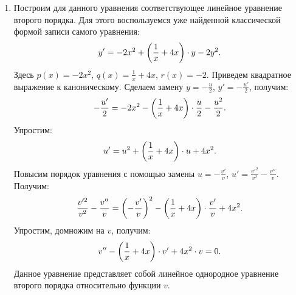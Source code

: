 \begin{enumerate}
			\item Построим для данного уравнения соответствующее линейное уравнение второго порядка. Для этого воспользуемся уже найденной классической формой записи самого уравнения:
				\[ y' = -2x^2 + \left( \frac{1}{x} + 4x \right) \cdot y - 2y^2. \]
				Здесь $p(x) = -2x^2$, $q(x) = \frac{1}{x} + 4x$, $r(x) = -2$. Приведем квадратное выражение к каноническому. Сделаем замену $y = -\frac{u}{2}$, $y' = -\frac{u'}{2}$, получим:
				\[ -\frac{u'}{2} = - 2x^2 - \left( \frac{1}{x} + 4x \right) \cdot \frac{u}{2} - \frac{u^2}{2}. \]
				Упростим:
				\[ u' = u^2 + \left( \frac{1}{x} + 4x \right) \cdot u + 4x^2. \]
				Повысим порядок уравнения с помощью замены $u = -\frac{v'}{v}$, $u' = \frac{v'^2}{v^2} - \frac{v''}{v}$. Получим:
				\[ \frac{v'^2}{v^2} - \frac{v''}{v} = \left( -\frac{v'}{v} \right)^2 - \left( \frac{1}{x} + 4x \right) \cdot \frac{v'}{v} + 4x^2. \]
				Упростим, домножим на $v$, получим:
				\[ v'' - \left( \frac{1}{x} + 4x \right) \cdot v' + 4x^2 \cdot v = 0. \]
				Данное уравнение представляет собой линейное однородное уравнение второго порядка относительно функции $v$.

		\end{enumerate}

